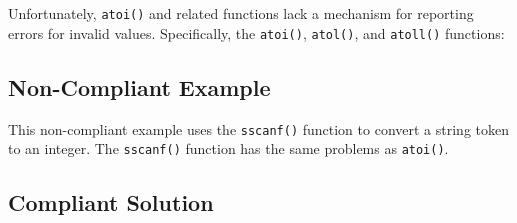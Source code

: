    Unfortunately, {\tt atoi()} and related functions lack a mechanism for reporting errors for invalid values. Specifically, the {\tt atoi()}, {\tt atol()}, and {\tt atoll()} functions:
   \subsection{Non-Compliant Example}

   This non-compliant example uses the {\tt sscanf()} function to convert a string token to an integer. The {\tt sscanf()} function has the same problems as {\tt atoi()}.

   \subsection{Compliant Solution}

